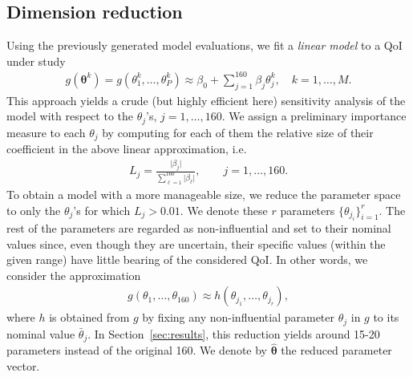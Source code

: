 \subsection{Dimension reduction}
Using the previously generated model evaluations, we fit a {\sl linear model} to a QoI under study
\begin{eqnarray}
g(\boldsymbol\theta^k) = g(\theta_1^k, \dots, \theta_P^k) \approx \beta_0 + \sum\limits_{j=1}^{160} \beta_j \theta_j^k, \quad k=1, \dots, M. \label{lr}
\end{eqnarray}
This approach yields a crude (but highly efficient here) sensitivity analysis of the model with respect to the $\theta_j$'s, $j=1,\dots, 160$. We assign a preliminary importance measure to each $\theta_j$ by computing for each of them the relative size of their coefficient in the above linear approximation, i.e.
\begin{eqnarray*}
L_j = \frac{\vert \beta_j \vert}{\sum\limits_{\ell=1}^{160} \vert \beta_\ell \vert}, \qquad j=1,\dots,160.
\end{eqnarray*}
To obtain a model with a more manageable size, we reduce the parameter space to only the $\theta_j$'s for which $L_j>0.01$. We denote these $r$ parameters $\{ \theta_{j_i}\}_{i=1}^r$. The rest of the parameters are regarded as non-influential and set to their nominal values since, even though they are uncertain, their specific values (within the given range) have little bearing of the considered QoI. In other words, we consider the approximation 
\begin{eqnarray}
g(\theta_1, \dots, \theta_{160}) \approx h(\theta_{j_1}, \dots, \theta_{j_r}), \label{reddim}
\end{eqnarray}
where $h$ is obtained from $g$ by fixing any non-influential parameter $\theta_j$ in $g$  to its nominal value $\bar\theta_j$. In Section~\ref{sec:results}, this reduction yields around 15-20 parameters instead of the original 160. We denote by $\hat{\boldsymbol{\theta}}$ the reduced parameter vector. 

